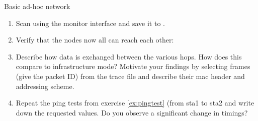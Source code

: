 \begin{exercise}{Basic ad-hoc network}
\begin{enumerate}
	\item Scan using the monitor interface and save it to .\newline
	\item Verify that the nodes now all can reach each other:\newline
	\item Describe how data is exchanged between the various hops. How does this compare to infrastructure mode? Motivate your findings by selecting frames (give the packet ID) from the trace file and describe their \ac{mac} header and addressing scheme.\newline
	\begin{esolution}
	\end{esolution}
	
	\item Repeat the ping tests from exercise \ref{ex:pingtest} (from \ac{sta}1 to \ac{sta}2 and write down the requested values. Do you observe a significant change in timings?\newline
	\begin{esolution}
	\end{esolution}
\end{enumerate}
	
\end{exercise}